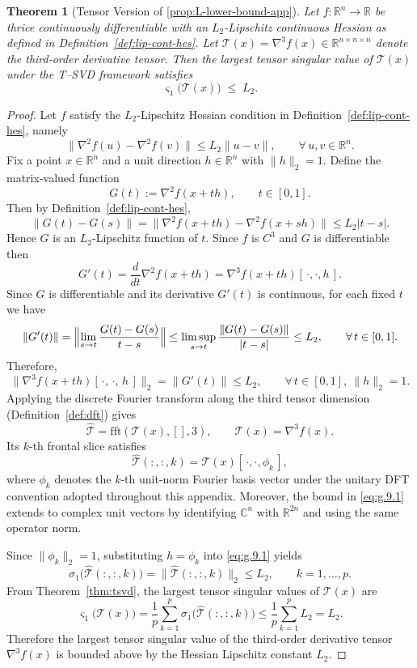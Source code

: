 \documentclass{article}
\theoremstyle{plain}
\newtheorem{theorem}{Theorem}
\theoremstyle{definition}
\theoremstyle{remark}
\begin{document}
\begin{theorem}[Tensor Version of \cref{prop:L-lower-bound-app}]
\label{thm:tensor-b3}
Let $f:\mathbb{R}^n\to\mathbb{R}$ be thrice continuously differentiable with an
$L_2$-Lipschitz continuous Hessian as defined in
Definition~\ref{def:lip-cont-hes}. Let $\mathcal{T}(x)=\nabla^3 f(x)\in\mathbb{R}^{n\times n\times n}$ denote the third-order derivative tensor.
Then the largest tensor singular value of $\mathcal{T}(x)$ under the T--SVD framework satisfies
\[
\varsigma_1\!\big(\mathcal{T}(x)\big) \;\le\; L_2.
\]
\end{theorem}
\begin{proof}
Let $f$ satisfy the $L_2$-Lipschitz Hessian condition in 
Definition~\ref{def:lip-cont-hes}, namely
\[
\|\nabla^{2} f(u)-\nabla^{2} f(v)\|\le L_2\|u-v\|,
\qquad \forall\,u,v\in\mathbb{R}^n.
\]
Fix a point $x\in\mathbb{R}^n$ and a unit direction $h\in\mathbb{R}^n$ with 
$\|h\|_2=1$.  
Define the matrix-valued function
\[
G(t) := \nabla^2 f(x + t h), \qquad t\in [0,1].
\]
Then by Definition~\ref{def:lip-cont-hes},
\[
\|G(t)-G(s)\|
= \|\nabla^2 f(x+th)-\nabla^2 f(x+sh)\|
\le L_2|t-s|.
\]
Hence $G$ is an $L_2$-Lipschitz function of $t$.  
Since $f$ is $C^3$ and $G$ is differentiable then
\[
G'(t)
= \frac{d}{dt}\nabla^2 f(x+th)
= \nabla^3 f(x+th)[\,\cdot,\cdot,h\,].
\]
Since $G$ is differentiable and its derivative $G'(t)$ is continuous,
for each fixed $t$ we have
\[
\|G'(t)\|
= \Bigl\|\lim_{s\to t}\frac{G(t)-G(s)}{t-s}\Bigr\|
\le \limsup_{s\to t}\frac{\|G(t)-G(s)\|}{|t-s|}
\le L_2, \qquad  \forall\,t\in[0,1].
\]
Therefore,
\begin{equation}\label{eq:g.9.1}
\big\|\nabla^3 f(x+th)[\,\cdot,\,\cdot,\,h\,]\big\|_2
= \|G'(t)\|
\le L_2,
\qquad \forall\,t\in[0,1],\ \|h\|_2=1.
\end{equation}
Applying the discrete Fourier transform along the third tensor dimension 
(Definition~\ref{def:dft}) gives
\[
\widehat{\mathcal{T}}
= \mathrm{fft}(\mathcal{T}(x),[],3),
\qquad 
\mathcal{T}(x)=\nabla^3 f(x).
\]
Its $k$-th frontal slice satisfies
\[
\widehat{\mathcal{T}}(:,:,k)
=\mathcal{T}(x)[\,\cdot,\cdot,\phi_k\,],
\]
where $\phi_k$ denotes the $k$-th unit-norm Fourier basis vector under the unitary DFT convention adopted throughout this appendix. 
Moreover, the bound in \eqref{eq:g.9.1} extends to complex unit vectors by identifying $\mathbb{C}^n$ with $\mathbb{R}^{2n}$ and using the same operator norm.

Since $\|\phi_k\|_2=1$, substituting $h=\phi_k$ into 
\eqref{eq:g.9.1} yields
\[
\sigma_{1}\!\big(\widehat{\mathcal{T}}(:,:,k)\big) =
\big\|\widehat{\mathcal{T}}(:,:,k)\big\|_2
\le L_2,
\qquad k=1,\dots,p.
\]
From Theorem~\ref{thm:tsvd}, the largest tensor singular values of $\mathcal{T}(x)$ are
\[
\varsigma_1\!\big(\mathcal{T}(x)\big)
= \frac{1}{p}\sum_{k=1}^{p}\sigma_{1}\!\big(\widehat{\mathcal{T}}(:,:,k)\big)
\le \frac{1}{p}\sum_{k=1}^{p}L_2
= L_2.
\]
Therefore the largest tensor singular value of the third-order derivative tensor
$\nabla^3 f(x)$ is bounded above by the Hessian Lipschitz constant $L_2$.
\end{proof}
\end{document}
